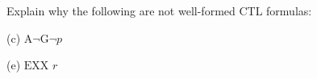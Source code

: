 Explain why the following are not well-formed CTL formulas:

(c) $\textrm{A}\neg \textrm{G}\neg p $

(e) $\textrm{EXX }r$
